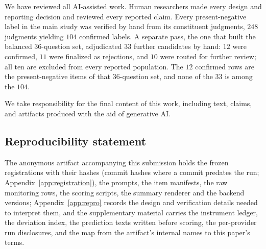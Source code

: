 \documentclass{article}
\begin{document}
We have reviewed all AI-assisted work.
Human researchers made every design and reporting decision and reviewed every reported claim.
Every present-negative label in the main study was verified by hand from its constituent judgments, $248$ judgments yielding $104$ confirmed labels.
A separate pass, the one that built the balanced $36$-question set, adjudicated $33$ further candidates by hand: $12$ were confirmed, $11$ were finalized as rejections, and $10$ were routed for further review; all ten are excluded from every reported population.
The $12$ confirmed rows are the present-negative items of that $36$-question set, and none of the $33$ is among the $104$.

We take responsibility for the final content of this work, including text, claims, and artifacts produced with the aid of generative AI.

\subsection*{Reproducibility statement}

The anonymous artifact accompanying this submission holds the frozen registrations with their hashes (commit hashes where a commit predates the run; Appendix~\ref{app:registration}), the prompts, the item manifests, the raw monitoring rows, the scoring scripts, the summary renderer and the backend versions; Appendix~\ref{app:repro} records the design and verification details needed to interpret them, and the supplementary material carries the instrument ledger, the deviation index, the prediction texts written before scoring, the per-provider run disclosures, and the map from the artifact's internal names to this paper's terms.
\end{document}

